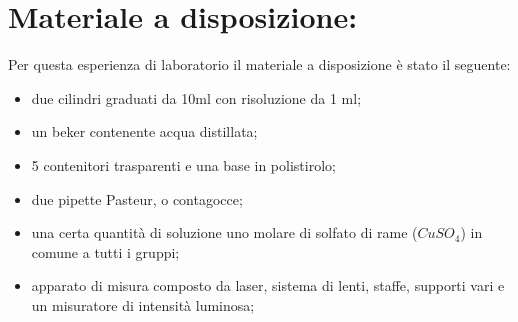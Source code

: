 \section{Materiale a disposizione:}

Per questa esperienza di laboratorio il materiale a disposizione è stato il seguente:
\begin{itemize}
	\item{due cilindri graduati da 10$\si{\milli\litre}$ con risoluzione da 1 $\si{\milli\litre}$;}
    \item{un beker contenente acqua distillata;}
	\item{5 contenitori trasparenti e una base in polistirolo;}
	\item{due pipette Pasteur, o contagocce;}
	\item{una certa quantità di soluzione uno molare di solfato di rame ($CuSO_4$) in comune a tutti i gruppi;}
	\item{apparato di misura composto da laser, sistema di lenti, staffe, supporti vari e un misuratore di intensità luminosa;}
\end{itemize}
